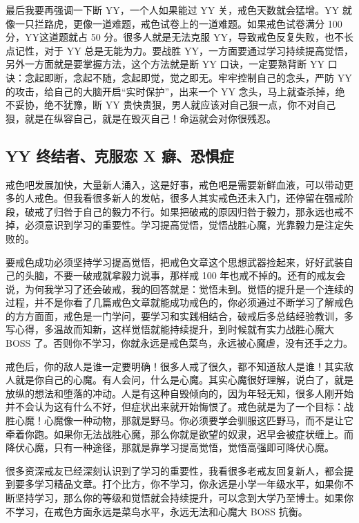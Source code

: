 \documentclass[fontset=founder]{ctexart}
\begin{document}
最后我要再强调一下断 YY，一个人如果能过 YY 关，戒色天数就会猛增。YY 就像一只拦路虎，更像一道难题，戒色试卷上的一道难题。如果戒色试卷满分 100 分，YY这道题就占 50 分。很多人就是无法克服 YY，导致戒色反复失败，也不长点记性，对于 YY 总是无能为力。要战胜 YY，一方面要通过学习持续提高觉悟，另外一方面就是要掌握方法，这个方法就是断 YY 口诀，一定要熟背断 YY 口诀：念起即断，念起不随，念起即觉，觉之即无。牢牢控制自己的念头，严防 YY 的攻击，给自己的大脑开启“实时保护”，出来一个 YY 念头，马上就查杀掉，绝不妥协，绝不犹豫，断 YY 贵快贵狠，男人就应该对自己狠一点，你不对自己狠，就是在纵容自己，就是在毁灭自己！命运就会对你很残忍。

\subsection{YY 终结者、克服恋 X 癖、恐惧症}

戒色吧发展加快，大量新人涌入，这是好事，戒色吧是需要新鲜血液，可以带动更多的人戒色。但我看很多新人的发帖，很多人其实戒色还未入门，还停留在强戒阶段，破戒了归咎于自己的毅力不行。如果把破戒的原因归咎于毅力，那永远也戒不掉，必须意识到学习的重要性。学习提高觉悟，觉悟战胜心魔，光靠毅力是注定失败的。

要戒色成功必须坚持学习提高觉悟，把戒色文章这个思想武器捡起来，好好武装自己的头脑，不要一破戒就拿毅力说事，那样戒 100 年也戒不掉的。还有的戒友会说，为何我学习了还会破戒，我的回答就是：觉悟未到。觉悟的提升是一个连续的过程，并不是你看了几篇戒色文章就能成功戒色的，你必须通过不断学习了解戒色的方方面面，戒色是一门学问，要学习和实践相结合，破戒后多总结经验教训，多写心得，多温故而知新，这样觉悟就能持续提升，到时候就有实力战胜心魔大 BOSS 了。否则你不学习，你就永远是戒色菜鸟，永远被心魔虐，没有还手之力。

戒色后，你的敌人是谁一定要明确！很多人戒了很久，都不知道敌人是谁！其实敌人就是你自己的心魔。有人会问，什么是心魔。其实心魔很好理解，说白了，就是放纵的想法和堕落的冲动。人是有这种自毁倾向的，因为年轻无知，很多人刚开始并不会认为这有什么不好，但症状出来就开始悔恨了。戒色就是为了一个目标：战胜心魔！心魔像一种动物，那就是野马。你必须要学会驯服这匹野马，而不是让它牵着你跑。如果你无法战胜心魔，那么你就是欲望的奴隶，迟早会被症状缠上。而降伏心魔，只有一种途径，那就是靠学习提高觉悟，觉悟高强即可降伏心魔。

很多资深戒友已经深刻认识到了学习的重要性，我看很多老戒友回复新人，都会提到要多学习精品文章。打个比方，你不学习，你永远是小学一年级水平，如果你不断坚持学习，那么你的等级和觉悟就会持续提升，可以念到大学乃至博士。如果你不学习，在戒色方面永远是菜鸟水平，永远无法和心魔大 BOSS 抗衡。
\end{document}
